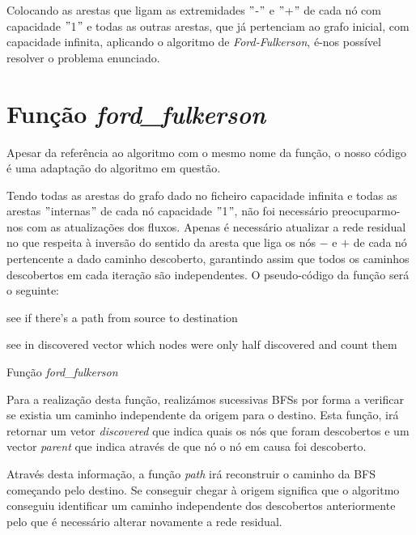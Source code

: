 \documentclass[a4paper]{article}
\begin{document}
Colocando as arestas que ligam as extremidades $"$-$"$ e $"$+$"$  de cada nó com capacidade $"$1$"$ e todas as outras arestas, que já pertenciam ao grafo inicial, com capacidade infinita, aplicando o algoritmo de \textit{Ford-Fulkerson}, é-nos possível resolver o problema enunciado.


\section{Função \textit{ford\_fulkerson}}
Apesar da referência ao algoritmo com o mesmo nome da função, o nosso código é uma adaptação do algoritmo em questão.

Tendo todas as arestas do grafo dado no ficheiro capacidade infinita e todas as arestas $"$internas$"$ de cada nó capacidade $"$1$"$, não foi necessário preocuparmo-nos com as atualizações dos fluxos. Apenas é necessário atualizar a rede residual no que respeita à inversão do sentido da aresta que liga os nós $-$ e $+$ de cada nó pertencente a dado caminho descoberto, garantindo assim que todos os caminhos descobertos em cada iteração são independentes.
\vskip 5mm
O pseudo-código da função será o seguinte:
\vskip 2mm
\begin{algorithm}[H]
	see if there's a path from source to destination\;
	
	
	see in discovered vector which nodes were only half discovered and count them\;
	
 \caption{Função \textit{ford\_fulkerson}}
\end{algorithm}
\vskip 5mm
Para a realização desta função, realizámos sucessivas BFSs por forma a verificar se existia um caminho independente da origem para o destino. Esta função, irá retornar um vetor \textit{discovered} que indica quais os nós que foram descobertos e um vector \textit{parent} que indica através de que nó o nó em causa foi descoberto.

Através desta informação, a função \textit{path} irá reconstruir o caminho da BFS começando pelo destino. Se conseguir chegar à origem significa que o algoritmo conseguiu identificar um caminho independente dos descobertos anteriormente pelo que é necessário alterar novamente a rede residual.
\end{document}
